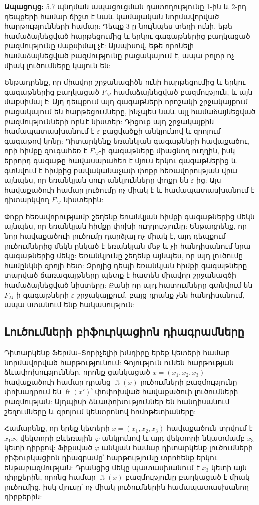 \documentclass[12pt,a4paper]{article}
\numberwithin{equation}{section}
\numberwithin{figure}{section}
\begin{document}
\textbf{Ապացույց:} 5.7 պնդման ապացուցման դատողությունը 1-ին և 2-րդ դեպքերի համար ճիշտ է նաև կամայական նորմավորված հարթությունների համար: Դեպք 3-ը նույնպես տեղի ունի, եթե համաձայնեցված հարթեցումից և երկու գագաթներից բաղկացած բազմությունը մաքսիմալ չէ: Այսպիսով, եթե որոնելի համաձայնեցված բազմությունը բացակայում է, ապա բոլոր ոչ միակ լուծումները կայուն են:

Ենթադրենք, որ միավոր շրջանագիծն ունի հարթեցումից և երկու գագաթներից բաղկացած $F_M$ համաձայնեցված բազմություն, և այն մաքսիմալ է: Այդ դեպքում այդ գագաթների որոշակի շրջակայքում բացակայում են հարթեցումները, ինչպես նաև այլ համաձայնեցված բազմությունների որևէ նիստեր: Դիցուք այդ շրջակայքին համապատասխանում է $\varepsilon$ բացվածքի անկյունով և զրոյում գագաթով կոնը: Դիտարկենք եռանկյան գագաթների հավաքածու, որի հիմքը զուգահեռ է $F_M$-ի գագաթները միացնող ուղղին, իսկ երրորդ գագաթը հավասարահեռ է մյուս երկու գագաթներից և գտնվում է հիմքից բավականաչափ փոքր հեռավորության վրա այնպես, որ եռանկյան սուր անկյունները փոքր են $\varepsilon$-ից: Այս հավաքածուի համար լուծումը ոչ միակ է և համապատասխանում է դիտարկվող $F_M$ նիստերին:

Փոքր հեռավորությամբ շեղենք եռանկյան հիմքի գագաթներից մեկն այնպես, որ եռանկյան հիմքը փոխի ուղղությունը: Ենթադրենք, որ նոր հավաքածուի լուծումը դարձյալ ոչ միակ է, այդ դեպքում լուծումներից մեկն ընկած է եռանկյան մեջ և չի հանդիսանում նրա գագաթներից մեկը: Եռանկյունը շեղենք այնպես, որ այդ լուծումը համընկնի զրոյի հետ: Զրոյից դեպի եռանկյան հիմքի գագաթները տարված ճառագայթները պետք է հատեն միավոր շրջանագծի համաձայնեցված նիստերը: Քանի որ այդ հատումները գտնվում են $F_M$-ի գագաթների $\varepsilon$-շրջակայքում, բայց դրանք չեն հանդիսանում, ապա ստանում ենք հակասություն: 

\subsection{Լուծումների բիֆուրկացիոն դիագրամները}

Դիտարկենք Ֆերմա--Տորիչելիի խնդիրը երեք կետերի համար նորմավորված հարթությունում: Գոյություն ունեն հարթության ձևափոխություններ, որոնք ցանկացած $x = (x_1, x_2, x_3)$ հավաքածուի համար դրանց $\operatorname{ft}(x)$ լուծումների բազմությունը փոխադրում են $\operatorname{ft}(x')$՝ փոփոխված հավաքածուի լուծումների բազմության: Այդպիսի ձևափոխություններ են հանդիսանում շեղումները և զրոյում կենտրոնով հոմոթետիաները:

Համարենք, որ երեք կետերի $x = (x_1, x_2, x_3)$ հավաքածուն տրվում է $x_1 x_2$ վեկտորի բևեռային $\varphi$ անկյունով և այդ վեկտորի նկատմամբ $x_3$ կետի դիրքով: Ֆիքսված $\varphi$ անկյան համար դիտարկենք լուծումների բիֆուրկացիոն դիագրամը՝ հարթությունը տրոհենք երկու ենթաբազմության: Դրանցից մեկը պատասխանում է $x_3$ կետի այն դիրքերին, որոնց համար $\operatorname{ft}(x)$ բազմությունը բաղկացած է միակ լուծումից, իսկ մյուսը՝ ոչ միակ լուծումներին համապատասխանող դիրքերին:
\end{document}
